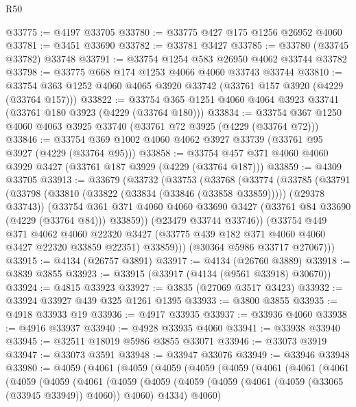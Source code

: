 \begin{lexlean}{R50}
\begin{coremodule}
@33775 := @4197 @33705
@33780 := @33775 @427 @175 @1256 @26952 @4060
@33781 := @3451 @33690
@33782 := @33781 @3427
@33785 := @33780 (@33745 @33782) @33748
@33791 := @33754 @1254 @583 @26950 @4062 @33744 @33782
@33798 := @33775 @668 @174 @1253 @4066 @4060 @33743 @33744
@33810 := @33754 @363 @1252 @4060 @4065 @3920 @33742 (@33761 @157 @3920 (@4229 (@33764 @157)))
@33822 := @33754 @365 @1251 @4060 @4064 @3923 @33741 (@33761 @180 @3923 (@4229 (@33764 @180)))
@33834 := @33754 @367 @1250 @4060 @4063 @3925 @33740 (@33761 @72 @3925 (@4229 (@33764 @72)))
@33846 := @33754 @369 @1002 @4060 @4062 @3927 @33739 (@33761 @95 @3927 (@4229 (@33764 @95)))
@33858 := @33754 @457 @371 @4060 @4060 @3929 @3427 (@33761 @187 @3929 (@4229 (@33764 @187)))
@33859 := @4309 @33705
@33913 := @33679
    (@33732
      (@33753
        (@33768
          (@33774
            (@33785
              (@33791
                (@33798 (@33810 (@33822 (@33834 (@33846 (@33858 @33859))))) (@29378 @33743))
                (@33754
                  @361
                  @371
                  @4060
                  @4060
                  @33690
                  @3427
                  (@33761 @84 @33690 (@4229 (@33764 @84)))
                  @33859))
              (@23479 @33744 @33746))
            (@33754
              @449
              @371
              @4062
              @4060
              @22320
              @3427
              (@33775 @439 @182 @371 @4060 @4060 @3427 @22320 @33859 @22351)
              @33859)))
        (@30364 @5986 @33717 @27067)))
@33915 := @4134 (@26757 @3891)
@33917 := @4134 (@26760 @3889)
@33918 := @3839 @3855
@33923 := @33915 (@33917 (@4134 (@9561 @33918) @30670))
@33924 := @4815 @33923
@33927 := @3835 (@27069 @3517 @3423)
@33932 := @33924 @33927 @439 @325 @1261 @1395
@33933 := @3800 @3855
@33935 := @4918 @33933 @19
@33936 := @4917 @33935
@33937 := @33936 @4060
@33938 := @4916 @33937
@33940 := @4928 @33935 @4060
@33941 := @33938 @33940
@33945 := @32511 @18019 @5986 @3855 @33071
@33946 := @33073 @3919
@33947 := @33073 @3591
@33948 := @33947 @33076
@33949 := @33946 @33948
@33980 := @4059
    (@4061
      (@4059
        (@4059
          (@4059
            (@4059
              (@4061
                (@4061
                  (@4061
                    (@4059
                      (@4059
                        (@4061
                          (@4059
                            (@4059
                              (@4059
                                (@4059 (@4061 (@4059 (@33065 (@33945 @33949)) @4060)) @4060)
                                @4334)
                              @4060)

\end{coremodule}
\end{lexlean}
